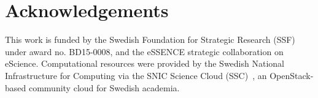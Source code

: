 \documentclass[conference]{IEEEtran}
\begin{document}

\section{Acknowledgements}
This work is funded by the Swedish Foundation for Strategic Research (SSF) under award no. BD15-0008, and the eSSENCE strategic collaboration on eScience. Computational resources were provided by the Swedish National Infrastructure for Computing via the SNIC Science Cloud (SSC)~\cite{ssc}, an OpenStack-based community cloud for Swedish academia. 



% 
% 


{
}
\end{document}
